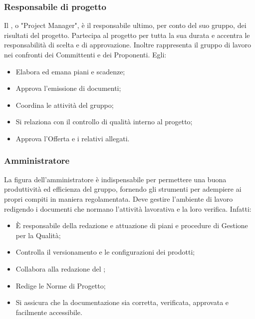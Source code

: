 \documentclass[NormeDiProgetto.tex]{subfiles}
\begin{document}
	\subsubsection{Responsabile di progetto}
	Il \respdiprog, o "Project Manager", è il responsabile ultimo, per conto del suo gruppo, dei risultati del progetto. Partecipa al progetto per tutta la sua durata e accentra le responsabilità di scelta e di approvazione. Inoltre rappresenta il gruppo di lavoro nei confronti dei Committenti e dei Proponenti. Egli:
	\begin{itemize}
		\item Elabora ed emana piani e scadenze;
		\item Approva l'emissione di documenti;
		\item Coordina le attività del gruppo;
		\item Si relaziona con il controllo di qualità interno al progetto;
		\item Approva l'Offerta e i relativi allegati.
	\end{itemize}

	\subsubsection{Amministratore}
	La figura dell'amministratore è indispensabile per permettere una buona produttività ed efficienza del gruppo, fornendo gli strumenti per adempiere ai propri compiti in maniera regolamentata. Deve gestire l'ambiente di lavoro redigendo i documenti che normano l'attività lavorativa e la loro verifica. Infatti:
	\begin{itemize}
		\item È responsabile della redazione e attuazione di piani e procedure di Gestione per la Qualità;
		\item Controlla il versionamento e le configurazioni dei prodotti;
		\item Collabora alla redazione del \pdp;
		\item Redige le Norme di Progetto;
		\item Si assicura che la documentazione sia corretta, verificata, approvata e facilmente accessibile.
	\end{itemize}
\end{document}
